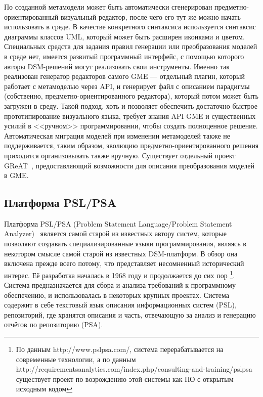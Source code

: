 По созданной метамодели может быть автоматически сгенерирован предметно-ориентированный 
визуальный редактор, после чего его тут же можно начать использовать в среде. В качестве 
конкретного синтаксиса используется синтаксис диаграммы классов UML, который может 
быть расширен иконками и цветом. Специальных средств для задания правил генерации 
или преобразования моделей в среде нет, имеется развитый программный интерфейс, с 
помощью которого авторы \ac{DSM}-решений могут реализовать свои инструменты. Именно так 
реализован генератор редакторов самого GME --- отдельный плагин, который работает с 
метамоделью через API, и генерирует файл с описанием парадигмы (собственно, предметно-ориентированного 
редактора), который потом может быть загружен в среду. Такой подход, хоть и позволяет 
обеспечить достаточно быстрое прототипирование визуального языка, требует знания API GME 
и существенных усилий в <<ручном>> программировании, чтобы создать полноценное решение. 
Автоматическая миграция моделей при изменении метамоделей также не поддерживается, 
таким образом, эволюцию предметно-ориентированного решения приходится организовывать 
также вручную. Существует отдельный проект GReAT~\cite{great}, предоставляющий возможности 
для описания преобразования моделей в GME.

\subsection{Платформа PSL/PSA}
Платформа PSL/PSA (Problem Statement Language/Problem Statement Analyzer)~\cite{teichroew1977psl} 
является самой старой из известных автору систем, которые позволяют создавать специализированные языки программирования, являясь в некотором
смысле самой старой из известных \ac{DSM}-платформ. В обзор она включена прежде всего потому, 
что представляет несомненный исторический интерес. Её разработка началась в 1968 году и продолжается до сих пор%
\footnote{По данным http://www.pslpsa.com/, система перерабатывается на современные технологии,
а по данным http://requirementsanalytics.com/index.php/consulting-and-training/pslpsa 
существует проект по возрождению этой системы как ПО с открытым исходным кодом}. Система 
предназначается для сбора и анализа требований к программному обеспечению, и использовалась в некоторых крупных
проектах. Система содержит в себе текстовый язык описания информационных систем (PSL), репозиторий, 
где хранятся описания и часть, отвечающую за анализ и генерацию отчётов по репозиторию (PSA).

